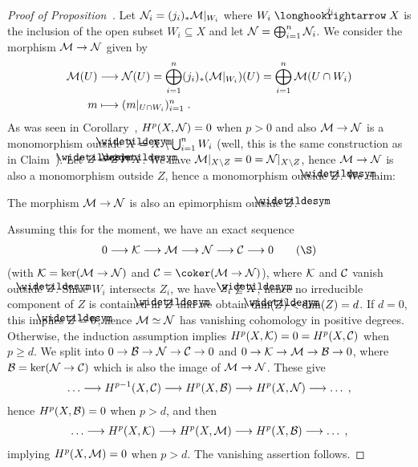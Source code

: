 \documentclass[a4paper,parskip=half,numbers=enddot, DIV=12]{scrreprt}
\begin{document}
\begin{proof}[Proof of Proposition~]
Let $\mathcal{N}_i = (j_i)_\ast\mathcal{M}\vert_{W_i}$ where $W_i\monomorphism[j_i]X$ is the inclusion of the open subset $W_i\subseteq X$ and let $\mathcal{N}=\bigoplus_{i=1}^n\mathcal{N}_i$. We consider the morphism $\Mm\morphism\Nn$ given by
\begin{align*}
\Mm(U)&\morphism\Nn(U)=\bigoplus_{i=1}^n(j_{i})_*(\Mm|_{W_i})(U)=\bigoplus_{i=1}^n\Mm(U\cap W_i)\\
m&\longmapsto (m|_{U\cap W_i})_{i=1}^n\;.
\end{align*}
As was seen in Corollary~, $H^p(X,\mathcal{N})=0$ when $p>0$ and also $\Mm\morphism\Nn$ is a monomorphism outside $\snake{X}=X\setminus\bigcup_{i=1}^nW_i$ (well, this is the same construction as in Claim~). Let $\snake{Z}=Z\cap \snake{X}$. 
We have $\mathcal{M}|_{X\setminus Z}=0=\mathcal{N}|_{X\setminus Z}$, hence $\Mm\morphism \Nn$ is also a monomorphism outside $Z$, hence a monomorphism outside $\snake{Z}$. We claim:
\begin{claim}
	The morphism $\Mm\morphism\Nn$ is also an epimorphism outside $\snake{Z}$.
\end{claim}
Assuming this for the moment, we have an exact sequence
\begin{align}\lbl{eq:4termsequence}
	0\morphism\Kk\morphism\Mm\morphism\Nn\morphism\Cc\morphism 0\tag{\S}
\end{align}
(with $\Kk=\ker(\Mm\morphism\Nn)$ and $\Cc=\coker(\Mm\morphism\Nn)$), where $\mathcal{K}$ and $\mathcal{C}$ vanish outside $\snake{Z}$. Since $W_i$ intersects $Z_i$, we have $Z_i\not\subseteq \snake{X}$, hence no irreducible component of $Z$ is contained in $\snake{Z}$ and we obtain $\dim(\snake{Z})<\dim(Z)=d$. If $d=0$, this implies $\snake{Z}=0$, hence $\mathcal{M}\simeq \mathcal{N}$ has vanishing cohomology in positive degrees. Otherwise, the induction assumption implies $H^p(X,\mathcal{K})=0=H^p(X,\mathcal{C})$ when $p\geq d$. We split  into $0\morphism\Bb\morphism\Nn\morphism\Cc\morphism 0$ and $0\morphism \Kk\morphism\Mm\morphism\Bb\morphism 0$, where $\Bb=\ker(\Nn\morphism\Cc)$ which is also the image of $\Mm\morphism\Nn$. These give
\begin{align*}
	\ldots\morphism H^{p-1}(X,\Cc)\morphism H^p(X,\Bb)\morphism H^p(X,\Nn)\morphism \ldots\;,
\end{align*}
hence $H^p(X,\mathcal{B})=0$ when $p>d$, and then
\begin{align*}
	\ldots\morphism H^p(X,\Kk)\morphism H^p(X,\Mm)\morphism H^p(X,\Bb)\morphism \ldots\;,
\end{align*}
implying $H^p(X,\mathcal{M})=0$ when $p>d$. The vanishing assertion follows.


\end{proof}
\end{document}
